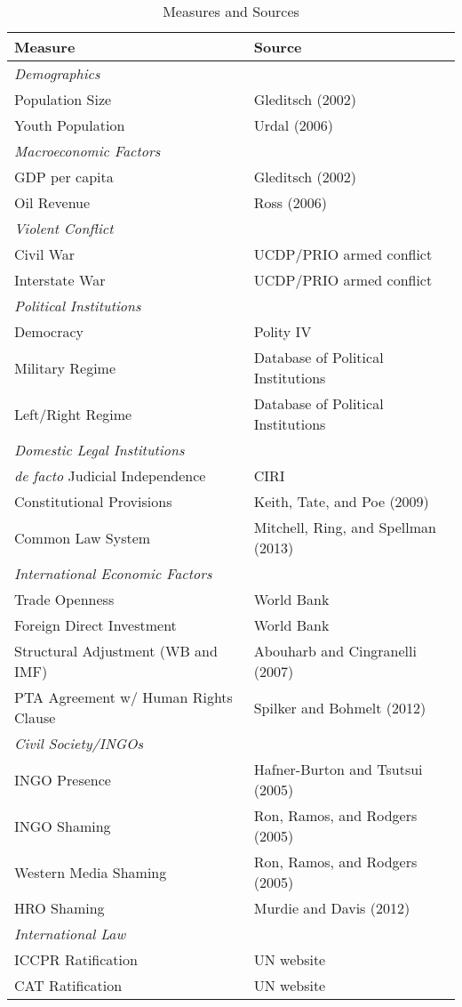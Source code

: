 \documentclass[12pt]{article}
\begin{document}
\begin{table}[htbp!] 
\caption{Measures and Sources} 
\label{tab:vars}
\centering
\begin{tabular}{ll}
Measure & Source \\
\toprule
{\em Demographics} & \\
Population Size & Gleditsch (2002) \\
Youth Population & Urdal (2006) \\ 
\midrule
{\em Macroeconomic Factors} & \\
GDP per capita & Gleditsch (2002) \\
Oil Revenue & Ross (2006) \\ 
\midrule
{\em Violent Conflict} & \\
Civil War & UCDP/PRIO armed conflict \\
Interstate War & UCDP/PRIO armed conflict \\
\midrule
{\em Political Institutions} & \\
Democracy & Polity IV \\
Military Regime & Database of Political Institutions \\
Left/Right Regime & Database of Political Institutions  \\
\midrule
{\em Domestic Legal Institutions} & \\
{\em de facto} Judicial Independence & CIRI \\
Constitutional Provisions & Keith, Tate, and Poe (2009) \\
Common Law System & Mitchell, Ring, and Spellman (2013) \\
\midrule
{\em International Economic Factors} & \\
Trade Openness & World Bank \\
Foreign Direct Investment & World Bank \\
Structural Adjustment (WB and IMF) & Abouharb and Cingranelli (2007) \\
PTA Agreement w/ Human Rights Clause & Spilker and Bohmelt (2012) \\
\midrule
{\em Civil Society/INGOs} & \\
INGO Presence & Hafner-Burton and Tsutsui (2005) \\
INGO Shaming & Ron, Ramos, and Rodgers (2005)  \\
Western Media Shaming & Ron, Ramos, and Rodgers (2005) \\
HRO Shaming & Murdie and Davis (2012) \\
\midrule
{\em International Law} & \\
ICCPR Ratification & UN website \\
CAT Ratification & UN website \\
\bottomrule
\end{tabular}
\end{table}
\end{document}
